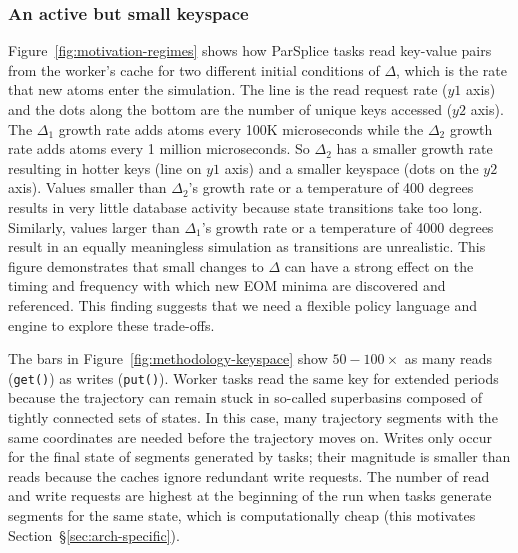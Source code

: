 \subsubsection*{An active but small keyspace}

Figure~\ref{fig:motivation-regimes} shows how ParSplice tasks read key-value
pairs from the worker's cache for two different initial conditions of
\(\Delta\), which is the rate that new atoms enter the simulation.  The line is
the read request rate (\(y1\) axis) and the dots along the bottom are the
number of unique keys accessed (\(y2\) axis).  The \(\Delta_1\) growth rate
adds atoms every 100K microseconds while the \(\Delta_2\) growth rate adds
atoms every 1 million microseconds. So \(\Delta_2\) has a smaller growth rate
resulting in hotter keys (line on \(y1\) axis) and a smaller keyspace (dots on
the \(y2\) axis).  Values smaller than \(\Delta_2\)'s growth rate or a
temperature of 400 degrees results in very little database activity because
state transitions take too long. Similarly, values larger than \(\Delta_1\)'s
growth rate or a temperature of 4000 degrees result in an equally meaningless
simulation as transitions are unrealistic.  This figure demonstrates that small
changes to \(\Delta\) can have a strong effect on the timing and frequency with
which new EOM minima are discovered and referenced. This finding suggests that
we need a flexible policy language and engine to explore these trade-offs.

The bars in Figure~\ref{fig:methodology-keyspace} show \(50-100\times\) as many
reads (\texttt{get()}) as writes (\texttt{put()}).  Worker tasks read the same
key for extended periods because the trajectory can remain stuck in so-called
superbasins composed of tightly connected sets of states. In this case, many
trajectory segments with the same coordinates are needed before the trajectory
moves on.  Writes only occur for the final state of segments generated by
tasks; their magnitude is smaller than reads because the caches ignore
redundant write requests. The number of read and write requests are highest at
the beginning of the run when tasks generate segments for the same state, which
is computationally cheap (this motivates Section~\S\ref{sec:arch-specific}).

